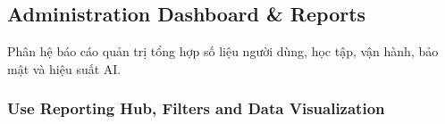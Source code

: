 \documentclass[12pt,a4paper,oneside]{report}
\begin{document}

\subsection{Administration Dashboard \& Reports}
\label{subsec:administration-dashboard-reports}

Phân hệ báo cáo quản trị tổng hợp số liệu người dùng, học tập, vận hành, bảo mật và hiệu suất AI.

\subsubsection{Use Reporting Hub, Filters and Data Visualization}
\label{subsubsec:use-reporting-hub}
\end{document}
